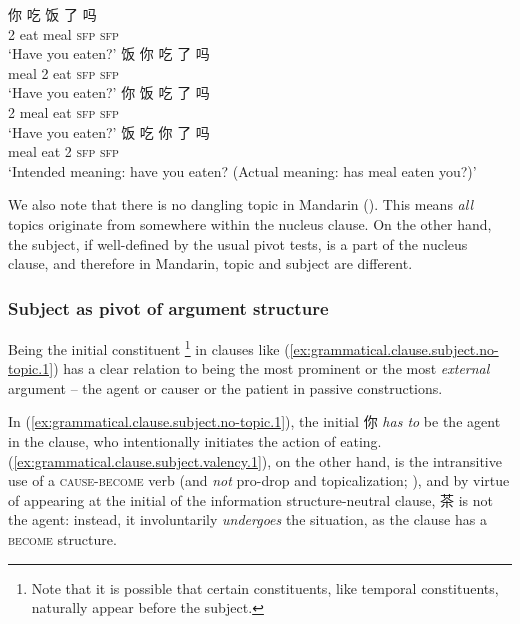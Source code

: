 \documentclass[UTF8, a4paper, oneside, scheme=plain, 12pt]{ctexrep}
\newcommand{\translate}[1]{`#1'}
\newcommand*{\category}[1]{\textsc{#1}}
\begin{document}
\begin{exe}
    \ex\label{ex:grammatical.clause.subject.no-topic} 
    \begin{xlist}
        \ex\label{ex:grammatical.clause.subject.no-topic.1}
        \gll 你 吃 饭 了 吗 \\
        2 eat meal \category{sfp} \category{sfp} \\
        \glt\translate{Have you eaten?} 
        \ex\label{ex:grammatical.clause.subject.no-topic.2}
        \gll 饭 你 吃 了 吗 \\
        meal 2 eat \category{sfp} \category{sfp} \\
        \glt\translate{Have you eaten?}
        \ex\label{ex:grammatical.clause.subject.no-topic.3}
        \gll 你 饭 吃 了 吗 \\
        2 meal eat \category{sfp} \category{sfp} \\
        \glt\translate{Have you eaten?}
        \ex\label{ex:grammatical.clause.subject.no-topic.4}
        \gll *饭 吃 你 了 吗  \\
        meal eat 2 \category{sfp} \category{sfp} \\
        \glt\translate{Intended meaning: have you eaten? (Actual meaning: has meal eaten you?)}
    \end{xlist}
\end{exe}

We also note that there is no dangling topic in Mandarin ().
This means \emph{all} topics originate from somewhere within the nucleus clause.
On the other hand, the subject, if well-defined by the usual pivot tests, is a part of the nucleus clause,
and therefore in Mandarin, topic and subject are different.

\subsubsection{Subject as pivot of argument structure}\label{sec:grammatical.clause.subject.argument}

Being the initial constituent%
\footnote{
    Note that it is possible that certain constituents, like temporal constituents,
    naturally appear before the subject.
}
in clauses like (\ref{ex:grammatical.clause.subject.no-topic.1}) 
has a clear relation to being the most prominent or the most \emph{external} argument
-- the agent or causer or the patient in passive constructions.

In (\ref{ex:grammatical.clause.subject.no-topic.1}),
the initial 你 \emph{has to} be the agent in the clause,
who intentionally initiates the action of eating.
(\ref{ex:grammatical.clause.subject.valency.1}),
on the other hand, is the intransitive use of a \category{cause}-\category{become} verb
(and \emph{not} pro-drop and topicalization; ),
and by virtue of appearing at the initial of
the information structure-neutral clause,
茶 is not the agent: instead, it involuntarily \emph{undergoes} the situation,
as the clause has a \category{become} structure.
\end{document}
